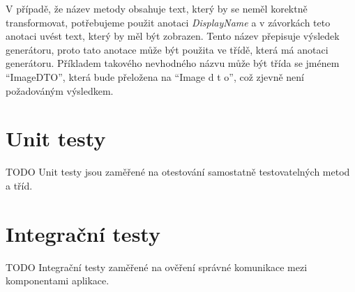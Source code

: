     V případě, že název metody obsahuje text, který by se neměl korektně transformovat, potřebujeme použit anotaci \textit{DisplayName} a v závorkách teto anotaci uvést text, který by měl být zobrazen. Tento název přepisuje výsledek generátoru, proto tato anotace může být použita ve třídě, která má anotaci generátoru. Příkladem takového nevhodného názvu může být třída se jménem \enquote{ImageDTO}, která bude přeložena na \enquote{Image d t o}, což zjevně není požadováným výsledkem.




    
\section{Unit testy}\label{testovani:unit}
    TODO Unit testy jsou zaměřené na otestování samostatně testovatelných metod a tříd.
\section{Integrační testy}\label{testovani:intergacni}
    TODO Integrační testy zaměřené na ověření správné komunikace mezi komponentami aplikace.
